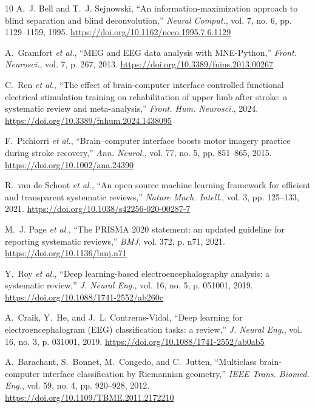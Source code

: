 \documentclass[preprint,12pt]{elsarticle}
\begin{document}
\begin{thebibliography}{10}
A.~J. Bell and T.~J. Sejnowski, ``An information-maximization approach to blind separation and blind deconvolution,'' \emph{Neural Comput.}, vol. 7, no. 6, pp. 1129--1159, 1995. \url{https://doi.org/10.1162/neco.1995.7.6.1129}

A.~Gramfort \emph{et al.}, ``MEG and EEG data analysis with MNE-Python,'' \emph{Front. Neurosci.}, vol. 7, p. 267, 2013. \url{https://doi.org/10.3389/fnins.2013.00267}

C.~Ren \emph{et al.}, ``The effect of brain-computer interface controlled functional electrical stimulation training on rehabilitation of upper limb after stroke: a systematic review and meta-analysis,'' \emph{Front. Hum. Neurosci.}, 2024. \url{https://doi.org/10.3389/fnhum.2024.1438095}

F.~Pichiorri \emph{et al.}, ``Brain--computer interface boosts motor imagery practice during stroke recovery,'' \emph{Ann. Neurol.}, vol. 77, no. 5, pp. 851--865, 2015. \url{https://doi.org/10.1002/ana.24390}

R.~van de Schoot \emph{et al.}, ``An open source machine learning framework for efficient and transparent systematic reviews,'' \emph{Nature Mach. Intell.}, vol. 3, pp. 125--133, 2021. \url{https://doi.org/10.1038/s42256-020-00287-7}

M.~J. Page \emph{et al.}, ``The PRISMA 2020 statement: an updated guideline for reporting systematic reviews,'' \emph{BMJ}, vol. 372, p. n71, 2021. \url{https://doi.org/10.1136/bmj.n71}

Y.~Roy \emph{et al.}, ``Deep learning-based electroencephalography analysis: a systematic review,'' \emph{J. Neural Eng.}, vol. 16, no. 5, p. 051001, 2019. \url{https://doi.org/10.1088/1741-2552/ab260c}

A.~Craik, Y.~He, and J.~L. Contreras-Vidal, ``Deep learning for electroencephalogram (EEG) classification tasks: a review,'' \emph{J. Neural Eng.}, vol. 16, no. 3, p. 031001, 2019. \url{https://doi.org/10.1088/1741-2552/ab0ab5}

A.~Barachant, S.~Bonnet, M.~Congedo, and C.~Jutten, ``Multiclass brain-computer interface classification by Riemannian geometry,'' \emph{IEEE Trans. Biomed. Eng.}, vol. 59, no. 4, pp. 920--928, 2012. \url{https://doi.org/10.1109/TBME.2011.2172210}


\end{thebibliography}
\end{document}
